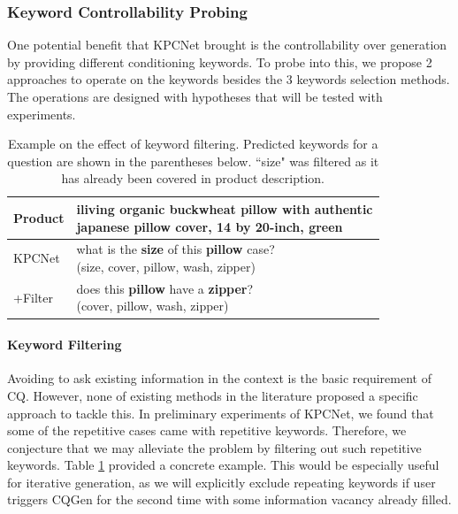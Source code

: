 \documentclass[letterpaper]{article} %
\begin{document}
\subsubsection{Keyword Controllability Probing}

One potential benefit that KPCNet brought is the controllability over generation by providing different conditioning keywords. To probe into this, we propose 2 approaches to operate on the keywords besides the 3 keywords selection methods. The operations are designed with hypotheses that will be tested with experiments.

\begin{table}
  \small
  \centering
\begin{tabular}{l|l}
\hline
Product & \makecell[l]{iliving organic buckwheat pillow with authentic \\ japanese pillow cover, 14 by 20-inch, green } \\
\hline
KPCNet & \makecell[l]{what is the \textbf{size} of this \textbf{pillow} case? \\ (size, cover, pillow, wash, zipper)} \\
+Filter        & \makecell[l]{does this \textbf{pillow} have a \textbf{zipper}? \\ (cover, pillow, wash, zipper)} \\
\hline
\end{tabular}
\caption{\label{tab:kwd-filter} Example on the effect of keyword filtering. Predicted keywords for a question are shown in the parentheses below. ``size" was filtered as it has already been covered in product description.}
\end{table}

\paragraph{Keyword Filtering} \label{para:filter} Avoiding to ask existing information in the context is the basic requirement of CQ. However, none of existing methods in the literature proposed a specific approach to tackle this. In preliminary experiments of KPCNet, we found that some of the repetitive cases came with repetitive keywords. Therefore, we conjecture that we may alleviate the problem by filtering out such repetitive keywords. Table \ref{tab:kwd-filter} provided a concrete example. This would be especially useful for iterative generation, as we will explicitly exclude repeating keywords if user triggers CQGen for the second time with some information vacancy already filled.
\end{document}
